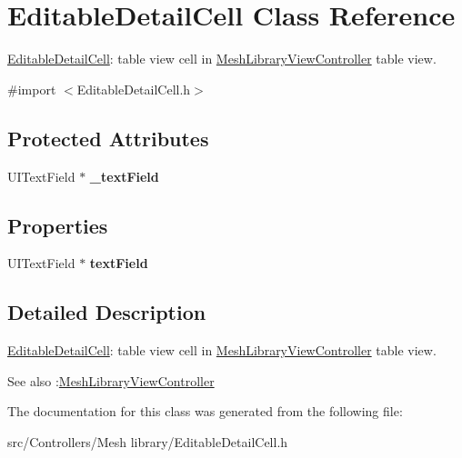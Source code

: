 \hypertarget{interface_editable_detail_cell}{
\section{\-Editable\-Detail\-Cell \-Class \-Reference}
\label{interface_editable_detail_cell}
}


\hyperlink{interface_editable_detail_cell}{\-Editable\-Detail\-Cell}\-: table view cell in \hyperlink{interface_mesh_library_view_controller}{\-Mesh\-Library\-View\-Controller} table view.  




{\ttfamily \#import $<$\-Editable\-Detail\-Cell.\-h$>$}

\subsection*{\-Protected \-Attributes}
\begin{DoxyCompactItemize}
\item 
\hypertarget{interface_editable_detail_cell_aa45fb6f977a5ed966c29491d31b0c933}{
\-U\-I\-Text\-Field $\ast$ {\bfseries \-\_\-text\-Field}}
\label{interface_editable_detail_cell_aa45fb6f977a5ed966c29491d31b0c933}

\end{DoxyCompactItemize}
\subsection*{\-Properties}
\begin{DoxyCompactItemize}
\item 
\hypertarget{interface_editable_detail_cell_a5c94a146ae5fa5a79211c6e39fdbe292}{
\-U\-I\-Text\-Field $\ast$ {\bfseries text\-Field}}
\label{interface_editable_detail_cell_a5c94a146ae5fa5a79211c6e39fdbe292}

\end{DoxyCompactItemize}


\subsection{\-Detailed \-Description}
\hyperlink{interface_editable_detail_cell}{\-Editable\-Detail\-Cell}\-: table view cell in \hyperlink{interface_mesh_library_view_controller}{\-Mesh\-Library\-View\-Controller} table view. 

\begin{DoxySeeAlso}{\-See also}
\-:\hyperlink{interface_mesh_library_view_controller}{\-Mesh\-Library\-View\-Controller} 
\end{DoxySeeAlso}


\-The documentation for this class was generated from the following file\-:\begin{DoxyCompactItemize}
\item 
src/\-Controllers/\-Mesh library/\-Editable\-Detail\-Cell.\-h\end{DoxyCompactItemize}
